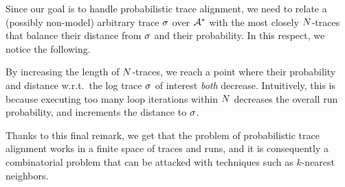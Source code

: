 Since our goal is to handle probabilistic trace alignment, we need to relate a (possibly non-model) arbitrary trace $\sigma$ over $\mathcal{A}^*$ with the most closely $N$-traces that balance their distance from $\sigma$ and their probability. In this respect, we notice the following.

\begin{remark}
By increasing the length of $N$-traces, we reach a point where their probability and distance w.r.t.~the log trace $\sigma$ of interest \emph{both} decrease. Intuitively, this is because executing too many loop iterations within $N$ decreases the overall run probability, and increments the distance to $\sigma$.
\end{remark}

Thanks to this final remark, we get that the problem of probabilistic trace alignment works in a finite space of traces and runs, and it is consequently a combinatorial problem that can be attacked with techniques such as $k$-nearest neighbors.












